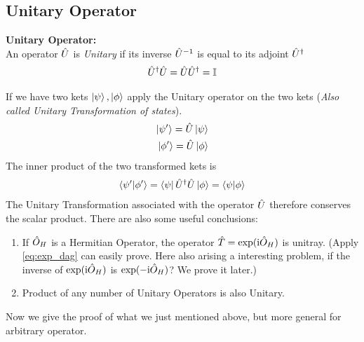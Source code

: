 \subsection{Unitary Operator}
\begin{definition}{\textbf{Unitary Operator:}}
    \\
    An operator $\hat{U}$ is \emph{Unitary} if its inverse $\hat{U}^{-1}$ is equal to its adjoint $\hat{U}^ \dag$
    \begin{eqnarray}
        \hat{U}^ \dag \hat{U} = \hat{U} \hat{U}^ \dag = \mathbb{I}
    \end{eqnarray}
\end{definition}

If we have two kets $\ket{\psi},\ket{\phi}$ apply the Unitary operator on the two kets (\emph{Also called Unitary Transformation of states}). 
\begin{align*}
    \ket{\psi'} = \hat{U} \ket{\psi}\\
    \ket{\phi'} = \hat{U} \ket{\phi}
\end{align*}
The inner product of the two transformed kets is 
\begin{align}
    \braket{\psi'|\phi'} = \bra{\psi} \hat{U}^ \dag \hat{U} \ket{\phi} = \braket{\psi|\phi} \label{eq:con_unitray}
\end{align}
The Unitary Transformation associated with the operator $\hat{U}$ therefore conserves the scalar product. There are also some useful conclusions: 
\begin{enumerate}
    \item If $\hat{O}_H$ is a Hermitian Operator, the operator $\hat{T} = \exp(\mathrm{i} \hat{O}_H)$ is unitray. (Apply \cref{eq:exp_dag} can easily prove. Here also arising a interesting problem, if the inverse of $\exp(\mathrm{i} \hat{O}_H)$ is $\exp(- \mathrm{i} \hat{O}_H)$? We prove it later.)  \label{item:1}
    \item Product of any number of Unitary Operators is also Unitary.
\end{enumerate}
Now we give the proof of what we just mentioned above, but more general for arbitrary operator.
